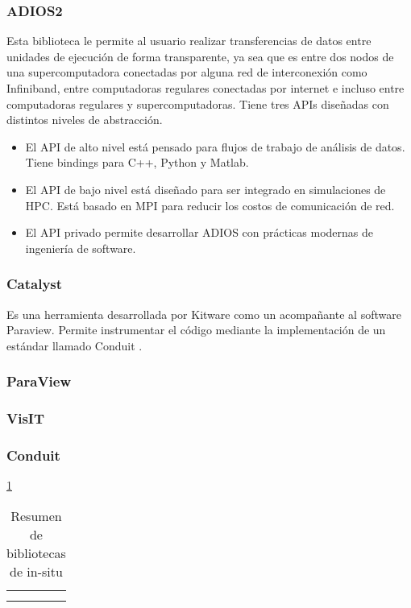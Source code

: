 \subsubsection{ADIOS2}
Esta biblioteca \cite{Godoy2020} le permite al usuario realizar transferencias de datos entre unidades de ejecución de forma transparente, ya sea que es entre dos nodos de una supercomputadora conectadas por alguna red de interconexión como Infiniband, entre computadoras regulares conectadas por internet e incluso entre computadoras regulares y supercomputadoras.
Tiene tres APIs diseñadas con distintos niveles de abstracción.
\begin{itemize}
  \item El API de alto nivel está pensado para flujos de trabajo de análisis de datos. Tiene bindings para C++, Python y Matlab.
  \item El API de bajo nivel está diseñado para ser integrado en simulaciones de HPC. Está basado en MPI para reducir los costos de comunicación de red.
  \item El API privado permite desarrollar ADIOS con prácticas modernas de ingeniería de software.
\end{itemize}
\subsubsection{Catalyst}
Es una herramienta desarrollada por Kitware como un acompañante al software Paraview. Permite instrumentar el código mediante la implementación de un estándar llamado Conduit \cite{Ayachit2021}.
\subsubsection{ParaView}

\subsubsection{VisIT}

\subsubsection{Conduit}

\ref{tab:insitu}
\begin{table}[]
    \centering
    \begin{tabular}{c|c}
         &  \\
         & 
    \end{tabular}
    \caption{Resumen de bibliotecas de in-situ}
    \label{tab:insitu}
\end{table}